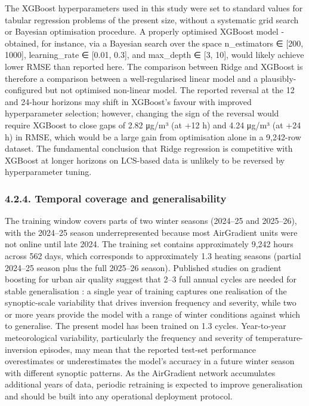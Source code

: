 The XGBoost hyperparameters used in this study were set to standard values for tabular regression problems of the present size, without a systematic grid search or Bayesian optimisation procedure. A properly optimised XGBoost model - obtained, for instance, via a Bayesian search over the space n\_estimators ∈ {[}200, 1000{]}, learning\_rate ∈ {[}0.01, 0.3{]}, and max\_depth ∈ {[}3, 10{]}, would likely achieve lower RMSE than reported here. The comparison between Ridge and XGBoost is therefore a comparison between a well-regularised linear model and a plausibly-configured but not optimised non-linear model. The reported reversal at the 12 and 24-hour horizons may shift in XGBoost's favour with improved hyperparameter selection; however, changing the sign of the reversal would require XGBoost to close gaps of 2.82 μg/m³ (at +12 h) and 4.24 μg/m³ (at +24 h) in RMSE, which would be a large gain from optimisation alone in a 9,242-row dataset. The fundamental conclusion that Ridge regression is competitive with XGBoost at longer horizons on LCS-based data is unlikely to be reversed by hyperparameter tuning.

\subsubsection{4.2.4. Temporal coverage and generalisability}\label{temporal-coverage-and-generalisability}

The training window covers parts of two winter seasons (2024--25 and 2025--26), with the 2024--25 season underrepresented because most AirGradient units were not online until late 2024. The training set contains approximately 9,242 hours across 562 days, which corresponds to approximately 1.3 heating seasons (partial 2024--25 season plus the full 2025--26 season). Published studies on gradient boosting for urban air quality suggest that 2--3 full annual cycles are needed for stable generalisation \cite{enebish2021ulaanbaatar, menares2021forecasting}: a single year of training captures one realisation of the synoptic-scale variability that drives inversion frequency and severity, while two or more years provide the model with a range of winter conditions against which to generalise. The present model has been trained on 1.3 cycles. Year-to-year meteorological variability, particularly the frequency and severity of temperature-inversion episodes, may mean that the reported test-set performance overestimates or underestimates the model's accuracy in a future winter season with different synoptic patterns. As the AirGradient network accumulates additional years of data, periodic retraining is expected to improve generalisation and should be built into any operational deployment protocol.

